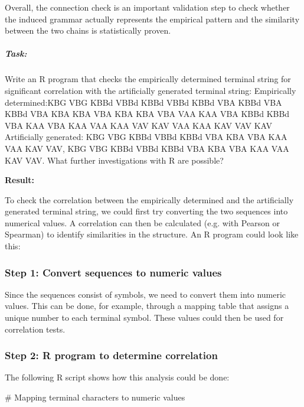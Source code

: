 \documentclass[
]{article}
\begin{document}
Overall, the connection check is an important validation step to check
whether the induced grammar actually represents the empirical pattern
and the similarity between the two chains is statistically proven.

\subparagraph{\texorpdfstring{\textbf{Task:}}{Task:}}\label{task}

Write an R program that checks the empirically determined terminal
string for significant correlation with the artificially generated
terminal string: Empirically determined:KBG VBG KBBd VBBd KBBd VBBd KBBd
VBA KBBd VBA KBBd VBA KBA KBA VBA KBA KBA VBA VAA KAA VBA KBBd KBBd VBA
KAA VBA KAA VAA KAA VAV KAV VAA KAA KAV VAV KAV Artificially generated:
KBG VBG KBBd VBBd KBBd VBA KBA VBA KAA VAA KAV VAV, KBG VBG KBBd VBBd
KBBd VBA KBA VBA KAA VAA KAV VAV. What further investigations with R are
possible?

\textbf{Result:}

To check the correlation between the empirically determined and the
artificially generated terminal string, we could first try converting
the two sequences into numerical values. A correlation can then be
calculated (e.g. with Pearson or Spearman) to identify similarities in
the structure. An R program could look like this:

\subsubsection{\texorpdfstring{\textbf{Step 1: Convert sequences to
numeric
values}}{Step 1: Convert sequences to numeric values}}\label{step-1-convert-sequences-to-numeric-values}

Since the sequences consist of symbols, we need to convert them into
numeric values. This can be done, for example, through a mapping table
that assigns a unique number to each terminal symbol. These values
\hspace{0pt}\hspace{0pt}could then be used for correlation tests.

\subsubsection{\texorpdfstring{\textbf{Step 2: R program to determine
correlation}}{Step 2: R program to determine correlation}}\label{step-2-r-program-to-determine-correlation}

The following R script shows how this analysis could be done:

\# Mapping terminal characters to numeric values
\end{document}
